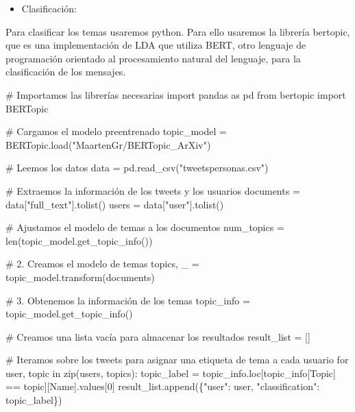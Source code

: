 \documentclass[
  letterpaper,
  DIV=11,
  numbers=noendperiod]{scrartcl}
\newenvironment{Shaded}{\begin{snugshade}}{\end{snugshade}}
\newcommand{\BuiltInTok}[1]{\textcolor[rgb]{0.00,0.23,0.31}{#1}}
\newcommand{\CommentTok}[1]{\textcolor[rgb]{0.37,0.37,0.37}{#1}}
\newcommand{\ControlFlowTok}[1]{\textcolor[rgb]{0.00,0.23,0.31}{#1}}
\newcommand{\DecValTok}[1]{\textcolor[rgb]{0.68,0.00,0.00}{#1}}
\newcommand{\ImportTok}[1]{\textcolor[rgb]{0.00,0.46,0.62}{#1}}
\newcommand{\KeywordTok}[1]{\textcolor[rgb]{0.00,0.23,0.31}{#1}}
\newcommand{\NormalTok}[1]{\textcolor[rgb]{0.00,0.23,0.31}{#1}}
\newcommand{\OperatorTok}[1]{\textcolor[rgb]{0.37,0.37,0.37}{#1}}
\newcommand{\StringTok}[1]{\textcolor[rgb]{0.13,0.47,0.30}{#1}}
\providecommand{\tightlist}{%
  \setlength{\itemsep}{0pt}\setlength{\parskip}{0pt}}\usepackage{longtable,booktabs,array}
\begin{document}
\begin{itemize}
\tightlist
\item
  Clasificación:
\end{itemize}

Para clasificar los temas usaremos python. Para ello usaremos la
librería bertopic, que es una implementación de LDA que utiliza BERT,
otro lenguaje de programación orientado al procesamiento natural del
lenguaje, para la clasificación de los mensajes.

\begin{Shaded}
\begin{Highlighting}[]
\CommentTok{\# Importamos las librerías necesarias}
\ImportTok{import}\NormalTok{ pandas }\ImportTok{as}\NormalTok{ pd}
\ImportTok{from}\NormalTok{ bertopic }\ImportTok{import}\NormalTok{ BERTopic}

\CommentTok{\# Cargamos el modelo preentrenado}
\NormalTok{topic\_model }\OperatorTok{=}\NormalTok{ BERTopic.load(}\StringTok{"MaartenGr/BERTopic\_ArXiv"}\NormalTok{)}

\CommentTok{\# Leemos los datos}
\NormalTok{data }\OperatorTok{=}\NormalTok{ pd.read\_csv(}\StringTok{"tweetspersonas.csv"}\NormalTok{)}

\CommentTok{\# Extraemos la información de los tweets y los usuarios}
\NormalTok{documents }\OperatorTok{=}\NormalTok{ data[}\StringTok{"full\_text"}\NormalTok{].tolist()}
\NormalTok{users }\OperatorTok{=}\NormalTok{ data[}\StringTok{"user"}\NormalTok{].tolist()}

\CommentTok{\# Ajustamos el modelo de temas a los documentos}
\NormalTok{num\_topics }\OperatorTok{=} \BuiltInTok{len}\NormalTok{(topic\_model.get\_topic\_info())}

\CommentTok{\# 2. Creamos el modelo de temas}
\NormalTok{topics, \_ }\OperatorTok{=}\NormalTok{ topic\_model.transform(documents)}

\CommentTok{\# 3. Obtenemos la información de los temas}
\NormalTok{topic\_info }\OperatorTok{=}\NormalTok{ topic\_model.get\_topic\_info()}

\CommentTok{\# Creamos una lista vacía para almacenar los resultados}
\NormalTok{result\_list }\OperatorTok{=}\NormalTok{ []}

\CommentTok{\# Iteramos sobre los tweets para asignar una etiqueta de tema a cada usuario}
\ControlFlowTok{for}\NormalTok{ user, topic }\KeywordTok{in} \BuiltInTok{zip}\NormalTok{(users, topics):}
\NormalTok{    topic\_label }\OperatorTok{=}\NormalTok{ topic\_info.loc[topic\_info[}\StringTok{\textquotesingle{}Topic\textquotesingle{}}\NormalTok{] }\OperatorTok{==}\NormalTok{ topic][}\StringTok{\textquotesingle{}Name\textquotesingle{}}\NormalTok{].values[}\DecValTok{0}\NormalTok{]}
\NormalTok{    result\_list.append(\{}\StringTok{"user"}\NormalTok{: user, }\StringTok{"classification"}\NormalTok{: topic\_label\})}


\end{Highlighting}
\end{Shaded}
\end{document}
